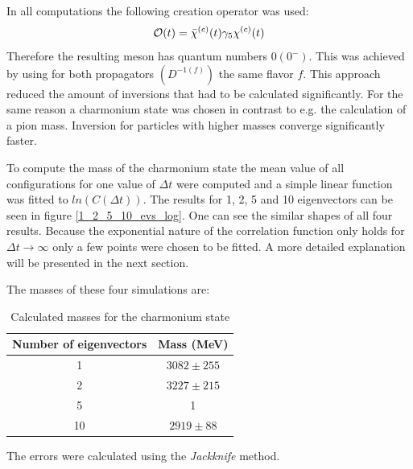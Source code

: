     In all computations the following creation operator was used:
    \begin{equation}
        \mathcal{O}(t) = \bar{\chi}^{(c)}(t)\gamma_5\chi^{(c)}(t)
    \end{equation}
    Therefore the resulting meson has quantum numbers $0(0^-)$. This was achieved by using for both propagators $(D^{-1(f)})$ the same flavor $f$. This approach reduced the amount of inversions that had to be calculated significantly. For the same reason a charmonium state was chosen in contrast to e.g. the calculation of a pion mass. Inversion for particles with higher masses converge significantly faster.
    
    To compute the mass of the charmonium state the mean value of all configurations for one value of $\Delta t$ were computed and a simple linear function was fitted to $ln(C(\Delta t))$. The results for 1, 2, 5 and 10 eigenvectors can be seen in figure \ref{1_2_5_10_evs_log}. One can see the similar shapes of all four results. Because the exponential nature of the correlation function only holds for $\Delta t \rightarrow \infty$ only a few points were chosen to be fitted. A more detailed explanation will be presented in the next section.
    
    The masses of these four simulations are:
    \begin{table}[h]
            \centering
            \begin{tabular}{|c|c|}
            \hline
            \multicolumn{1}{|c|}{Number of eigenvectors} & \multicolumn{1}{c|}{Mass (MeV)} \\ \hline
             1 & $3082 \pm 255$\\
             2 & $3227 \pm 215$\\
             5 & 1\\
             10& $2919 \pm 88$\\
              \hline
            \end{tabular}
            \caption{Calculated masses for the charmonium state}
            \label{meson_masses}
        \end{table}
        
    The errors were calculated using the \textit{Jackknife}\cite{jackknife} method.
    
